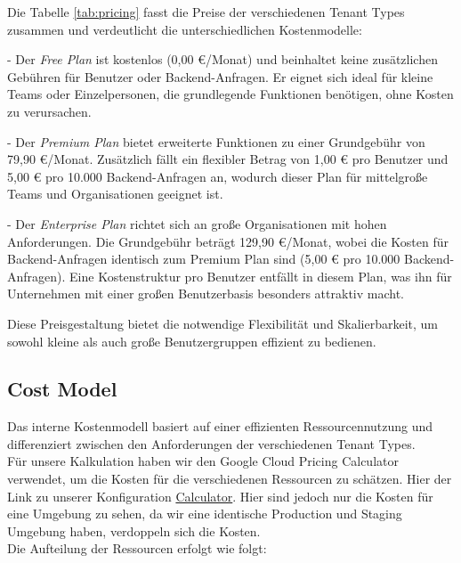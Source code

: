 Die Tabelle \ref{tab:pricing} fasst die Preise der verschiedenen Tenant Types zusammen und verdeutlicht die unterschiedlichen Kostenmodelle:

- Der \textit{Free Plan} ist kostenlos (0,00 €/Monat) und beinhaltet keine zusätzlichen Gebühren für Benutzer oder Backend-Anfragen.
Er eignet sich ideal für kleine Teams oder Einzelpersonen, die grundlegende Funktionen benötigen, ohne Kosten zu verursachen.

- Der \textit{Premium Plan} bietet erweiterte Funktionen zu einer Grundgebühr von 79,90 €/Monat.
Zusätzlich fällt ein flexibler Betrag von 1,00 € pro Benutzer und 5,00 € pro 10.000 Backend-Anfragen an, wodurch dieser Plan für mittelgroße Teams und Organisationen geeignet ist.

- Der \textit{Enterprise Plan} richtet sich an große Organisationen mit hohen Anforderungen.
Die Grundgebühr beträgt 129,90 €/Monat, wobei die Kosten für Backend-Anfragen identisch zum Premium Plan sind (5,00 € pro 10.000 Backend-Anfragen).
Eine Kostenstruktur pro Benutzer entfällt in diesem Plan, was ihn für Unternehmen mit einer großen Benutzerbasis besonders attraktiv macht.

Diese Preisgestaltung bietet die notwendige Flexibilität und Skalierbarkeit, um sowohl kleine als auch große Benutzergruppen effizient zu bedienen.

\subsection{Cost Model}
Das interne Kostenmodell basiert auf einer effizienten Ressourcennutzung und differenziert zwischen den Anforderungen der verschiedenen Tenant Types. \\
Für unsere Kalkulation haben wir den Google Cloud Pricing Calculator verwendet, um die Kosten für die verschiedenen Ressourcen zu schätzen. Hier der Link zu unserer Konfiguration \href{https://cloud.google.com/products/calculator?hl=de&dl=CjhDaVExWXpBNE5UUm1OaTA0TUdKaUxUUTFPVFl0T0dGa09DMWxZVEEzTVdZeVlXSm1ZalVRQVE9PRAJGiQzREI3QkJCQS04Nzc0LTQ5RTEtODY5Qy1DQjVCREI5NzlGMDM}{Calculator}. Hier sind jedoch nur die Kosten für eine Umgebung zu sehen, da wir eine identische Production und Staging Umgebung haben, verdoppeln sich die Kosten.  \\
Die Aufteilung der Ressourcen erfolgt wie folgt:

